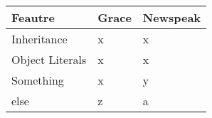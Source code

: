 \begin{tabular}{l|ll}
Feautre         & Grace & Newspeak \\ \hline
Inheritance     & x     & x        \\
Object Literals & x     & x        \\
Something       & x     & y        \\
else            & z     & a       
\end{tabular}